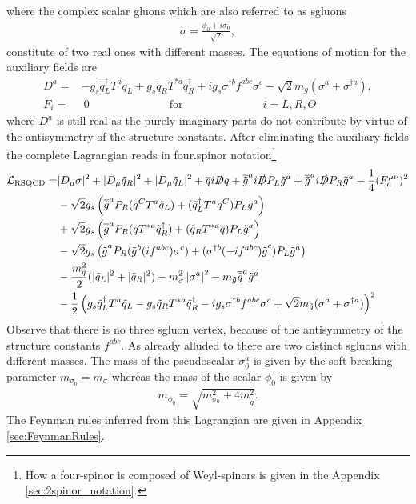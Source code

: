 where the complex scalar gluons which are also referred to as sgluons
\begin{align}
\sigma = \frac{\phi_0 + i\sigma_0}{\sqrt{2}},
\end{align}
constitute of two real ones with different masses.
The equations of motion for the auxiliary fields are
\begin{align}
D^a =& -g_s \tilde{q}_L^\dagger T^a \tilde{q}_L + g_s \tilde{q}_R T^{\ast a} \tilde{q}_R^\dagger + ig_s\sigma^{\dagger b}f^{abc}\sigma^c -\sqrt{2}m_g(\sigma^a + \sigma^{\dagger a}),\\
F_i =&\ 0 \hspace{3cm} \mathrm{for} \hspace{3cm} i = L,R,O
\end{align}
where $D^a$ is still real as the purely imaginary parts do not contribute by virtue of the antisymmetry of the structure constants. After eliminating the auxiliary fields the complete Lagrangian reads in four.spinor notation\footnote{How a four-spinor is composed of Weyl-spinors is given in the Appendix \ref{sec:2spinor_notation}.}
\begin{align}
\mathcal{L}_{\mathrm{RSQCD}} = & |D_\mu \sigma|^2 + |D_\mu \tilde{q}_R|^2 + |D_\mu \tilde{q}_L|^2 + \overline{q}i\slashed{D}q + \overline{\tilde{g}}^ai\slashed{D}P_L\tilde{g}^a + \overline{\tilde{g}}^ai\slashed{D}P_R\tilde{g}^a - \frac{1}{4} (F_a^{\mu\nu})^2\nonumber\\
& -\sqrt{2}g_s \left( \overline{\tilde{g}}^a P_R (q^C T^a \tilde{q}_L) + (\tilde{q}_L^\dagger T^a \overline{q}^C)P_L\tilde{g}^a \right)\nonumber\\
& +\sqrt{2}g_s \left( \overline{\tilde{g}}^a P_R (q T^{\ast a} \tilde{q}_R^\dagger) + (\tilde{q}_R T^{\ast a} \overline{q})P_L\tilde{g}^a \right) \nonumber\\
& -\sqrt{2}g_s \left( \overline{\tilde{g}}^a P_R (\tilde{g}^b (if^{abc}) \sigma^c) + (\sigma^{\dagger b} (-if^{abc}) \overline{\tilde{g}}^c)P_L\tilde{g}^a \right) \nonumber\\
& -\frac{m_{\tilde{q}}^2}{2}(|\tilde{q}_L|^2 + |\tilde{q}_R|^2) -m_{\sigma}^2\left|\sigma^a\right|^2  - m_{\tilde{g}} \overline{\tilde{g}}^a\tilde{g}^a\nonumber\\
& -\frac{1}{2}\left( g_s \tilde{q}_L^\dagger T^a \tilde{q}_L - g_s \tilde{q}_R T^{\ast a} \tilde{q}_R^\dagger - ig_s\sigma^{\dagger b}f^{abc}\sigma^c + \sqrt{2}m_{\tilde{g}}(\sigma^a + \sigma^{\dagger a}) \right)^2\label{eq:L_RSQCD}
\end{align}
Observe that there is no three sgluon vertex, because of the antisymmetry of the structure constants $f^{abc}$. As already alluded to there are two distinct sgluons with different masses. The mass of the pseudoscalar $\sigma_0^a$ is given by the soft breaking parameter $m_{\sigma_0} = m_\sigma$ whereas the mass of the scalar $\phi_0$ is given by 
\begin{align}
m_{\phi_0} = \sqrt{m_{\sigma_0}^2 + 4 m_{\tilde{g}}^2}.
\end{align}
The Feynman rules inferred from this Lagrangian are given in Appendix \ref{sec:FeynmanRules}.
\newpage
